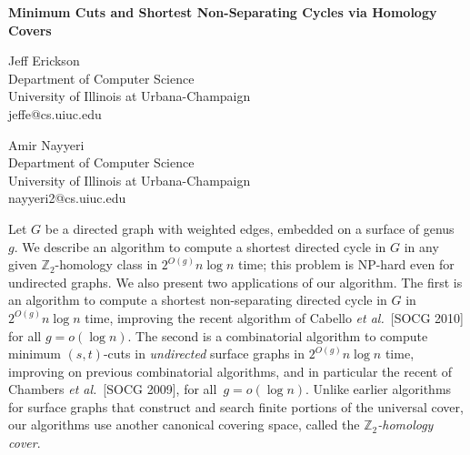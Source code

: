 \documentclass[10pt]{article}
\begin{document}
\baselineskip=9pt 

\begin{center}{\large \bf Minimum Cuts and Shortest Non-Separating Cycles via Homology Covers}
\begin{multicols}{2}
	Jeff Erickson\\[1ex]
	Department of Computer Science\\
	University of Illinois at Urbana-Champaign\\
	jeffe@cs.uiuc.edu

	Amir Nayyeri\\[1ex]
	Department of Computer Science\\
	University of Illinois at Urbana-Champaign\\
	nayyeri2@cs.uiuc.edu
\end{multicols}
\end{center}

\def\Z{\mathbb{Z}}
\def\etal{\emph{et al.}}

Let $G$ be a directed graph with weighted edges, embedded on a surface of genus~$g$.  We describe an algorithm to compute a shortest directed cycle in $G$ in any given $\Z_2$-homology class in $2^{O(g)}n\log n$ time; this problem is {NP}-hard even for undirected graphs.  We also present two applications of our algorithm.  The first is an algorithm to compute a shortest non-separating directed cycle in $G$ in $2^{O(g)} n\log n$ time, improving the recent algorithm of Cabello \etal\ [SOCG 2010] for all $g=o(\log n)$.  The second is a combinatorial algorithm to compute minimum $(s,t)$-cuts in \emph{undirected} surface graphs in $2^{O(g)} n\log n$ time, improving on previous combinatorial algorithms, and in particular the recent  of Chambers \etal\ [SOCG 2009], for all~$g = o(\log n)$.  Unlike earlier algorithms for surface graphs that construct and search finite portions of the universal cover, our algorithms use another canonical covering space, called  the \emph{$\Z_2$-homology cover}.

\bigskip
\end{document}

